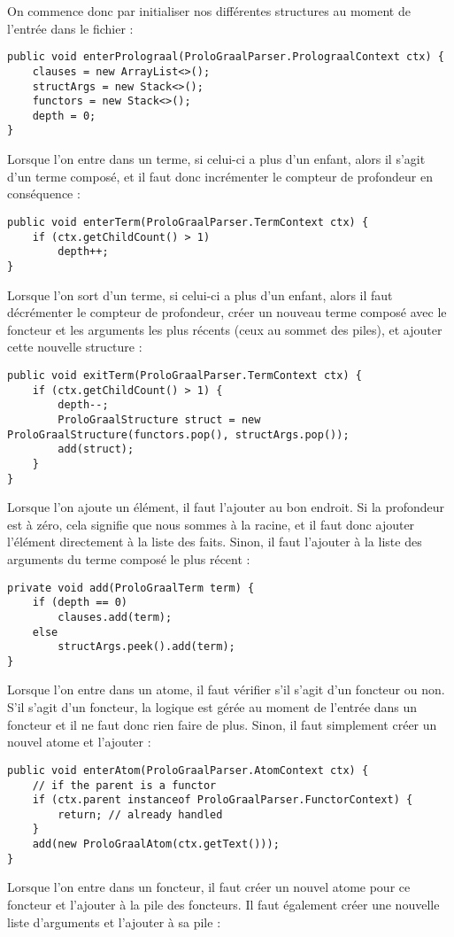\documentclass[../report.tex]{subfiles}
\begin{document}
On commence donc par initialiser nos différentes structures au moment de l'entrée dans le fichier :
\begin{verbatim}
public void enterProlograal(ProloGraalParser.ProlograalContext ctx) {
    clauses = new ArrayList<>();
    structArgs = new Stack<>();
    functors = new Stack<>();
    depth = 0;
}
\end{verbatim}
Lorsque l'on entre dans un terme, si celui-ci a plus d'un enfant, alors il s'agit d'un terme composé, et il faut donc incrémenter le compteur de profondeur en conséquence :
\begin{verbatim}
public void enterTerm(ProloGraalParser.TermContext ctx) {
    if (ctx.getChildCount() > 1)
        depth++;
}
\end{verbatim}
Lorsque l'on sort d'un terme, si celui-ci a plus d'un enfant, alors il faut décrémenter le compteur de profondeur, créer un nouveau terme composé avec le foncteur et les arguments les plus récents (ceux au sommet des piles), et ajouter cette nouvelle structure :
\begin{verbatim}
public void exitTerm(ProloGraalParser.TermContext ctx) {
    if (ctx.getChildCount() > 1) {
        depth--;
        ProloGraalStructure struct = new ProloGraalStructure(functors.pop(), structArgs.pop());
        add(struct);
    }
}
\end{verbatim}
Lorsque l'on ajoute un élément, il faut l'ajouter au bon endroit. Si la profondeur est à zéro, cela signifie que nous sommes à la racine, et il faut donc ajouter l'élément directement à la liste des faits. Sinon, il faut l'ajouter à la liste des arguments du terme composé le plus récent :
\begin{verbatim}
private void add(ProloGraalTerm term) {
    if (depth == 0)
        clauses.add(term);
    else
        structArgs.peek().add(term);
}
\end{verbatim}
Lorsque l'on entre dans un atome, il faut vérifier s'il s'agit d'un foncteur ou non. S'il s'agit d'un foncteur, la logique est gérée au moment de l'entrée dans un foncteur et il ne faut donc rien faire de plus. Sinon, il faut simplement créer un nouvel atome et l'ajouter :
\begin{verbatim}
public void enterAtom(ProloGraalParser.AtomContext ctx) {
    // if the parent is a functor
    if (ctx.parent instanceof ProloGraalParser.FunctorContext) {
        return; // already handled
    }
    add(new ProloGraalAtom(ctx.getText()));
}
\end{verbatim}
Lorsque l'on entre dans un foncteur, il faut créer un nouvel atome pour ce foncteur et l'ajouter à la pile des foncteurs. Il faut également créer une nouvelle liste d'arguments et l'ajouter à sa pile :
\end{document}
